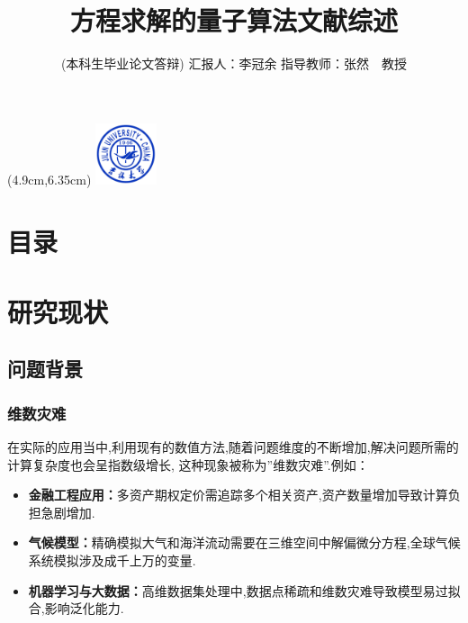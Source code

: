 \documentclass{beamer}
\title{方程求解的量子算法文献综述}
\author[李冠余]{
	{\fontsize{11pt}{13pt}\selectfont(本科生毕业论文答辩)}
	\vskip 15pt \hspace{-7pt}汇报人：李冠余
	\vskip 5pt 指导教师：张然~~教授}
\institute{吉林大学数学学院}
\date{}
\begin{document}
	\begin{spacing}{1.2}
	\setlength{\parindent}{1em}
	{\fontsize{8.5pt}{13pt}\selectfont
	\begin{frame}%
		\vspace{-0.5cm}
		\titlepage
		\vfill
		\begin{textblock*}{5cm}(4.9cm,6.35cm)  
			\includegraphics[width=1.8cm]{jd-xhh.jpg}  %
		\end{textblock*}
		\vspace*{1cm}
	\end{frame}

    \section*{目录}
    	\begin{frame}
    		\frametitle{\secname}
    		\tableofcontents[sections={<1-4>}]
    		
    	\end{frame}
    	\AtBeginSubsection[]{
    		\begin{frame}<handout:0>
    			\frametitle{目录}
    			\tableofcontents[currentsection,currentsubsection,sections={<1-4>}]
    		\end{frame}
    		\addtocounter{framenumber}{-1}  %
    	}
    
    
    \section{研究现状}
    \subsection{问题背景}
    \begin{frame}
    \frametitle{维数灾难}
     在实际的应用当中,利用现有的数值方法,随着问题维度的不断增加,解决问题所需的计算复杂度也会呈指数级增长, 这种现象被称为”维数灾难”.例如：
     \vspace{5pt}
    		\begin{itemize}
    			\item \textbf{金融工程应用：}多资产期权定价需追踪多个相关资产,资产数量增加导致计算负担急剧增加.
    			\item \textbf{气候模型：}精确模拟大气和海洋流动需要在三维空间中解偏微分方程,全球气候系统模拟涉及成千上万的变量.
    			\item \textbf{机器学习与大数据：}高维数据集处理中,数据点稀疏和维数灾难导致模型易过拟合,影响泛化能力.
    		\end{itemize}
 \end{frame}

}
\end{spacing}
\end{document}
